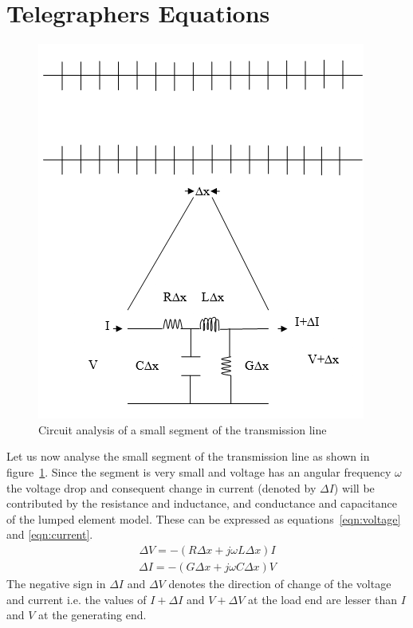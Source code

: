 \section{Telegraphers Equations}
\begin{figure}[h]
\centering
\includegraphics[scale=0.4]{./graphics/seventh}
\caption{Circuit analysis of a small segment of the transmission line}
\label{fig:seventh}
\end{figure}

Let us now analyse the small segment of the transmission line as shown in figure~\ref{fig:seventh}. Since the segment is very small and voltage has an angular frequency $ \omega $ the voltage drop and consequent change in current (denoted by $\Delta I$) will be contributed by the resistance and inductance, and conductance and capacitance of the lumped element model. These can be expressed as equations~\eqref{eqn:voltage} and \eqref{eqn:current}.
\begin{align}  
\Delta V = - (R \Delta x + j\omega L\Delta x)I
\label{eqn:voltage}
\end{align}
\begin{align}
\Delta I = - (G \Delta x + j \omega C \Delta x)V
\label{eqn:current}
\end{align}
The negative sign in $ \Delta I $ and $ \Delta V $ denotes the direction of change of the voltage and current i.e. the values of $I + \Delta I$ and $V + \Delta V$ at the load end are lesser than $I$ and $V$ at the generating end.


